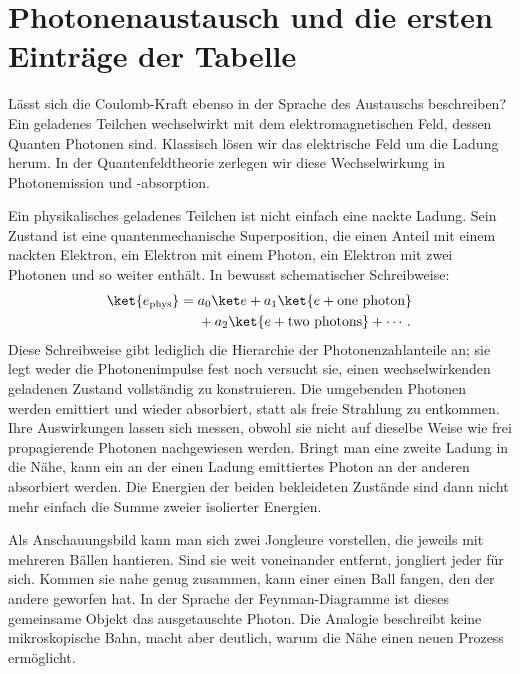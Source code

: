 \section{Photonenaustausch und die ersten Einträge der Tabelle}

Lässt sich die Coulomb-Kraft ebenso in der Sprache des Austauschs beschreiben? Ein geladenes Teilchen wechselwirkt mit dem elektromagnetischen Feld, dessen Quanten Photonen sind. Klassisch lösen wir das elektrische Feld um die Ladung herum. In der Quantenfeldtheorie zerlegen wir diese Wechselwirkung in Photonemission und -absorption.

Ein physikalisches geladenes Teilchen ist nicht einfach eine nackte Ladung. Sein Zustand ist eine quantenmechanische Superposition, die einen Anteil mit einem nackten Elektron, ein Elektron mit einem Photon, ein Elektron mit zwei Photonen und so weiter enthält. In bewusst schematischer Schreibweise:
\begin{equation}
\begin{aligned}
\ket{e_{\mathrm{phys}}}
={}&a_0\ket e
+a_1\ket{e+\text{one photon}}
\\
&+a_2\ket{e+\text{two photons}}+\cdots .
\end{aligned}
\end{equation}
Diese Schreibweise gibt lediglich die Hierarchie der Photonenzahlanteile an; sie legt weder die Photonenimpulse fest noch versucht sie, einen wechselwirkenden geladenen Zustand vollständig zu konstruieren.
Die umgebenden Photonen werden emittiert und wieder absorbiert, statt als freie Strahlung zu entkommen. Ihre Auswirkungen lassen sich messen, obwohl sie nicht auf dieselbe Weise wie frei propagierende Photonen nachgewiesen werden. Bringt man eine zweite Ladung in die Nähe, kann ein an der einen Ladung emittiertes Photon an der anderen absorbiert werden. Die Energien der beiden bekleideten Zustände sind dann nicht mehr einfach die Summe zweier isolierter Energien.

Als Anschauungsbild kann man sich zwei Jongleure vorstellen, die jeweils mit mehreren Bällen hantieren. Sind sie weit voneinander entfernt, jongliert jeder für sich. Kommen sie nahe genug zusammen, kann einer einen Ball fangen, den der andere geworfen hat. In der Sprache der Feynman-Diagramme ist dieses gemeinsame Objekt das ausgetauschte Photon. Die Analogie beschreibt keine mikroskopische Bahn, macht aber deutlich, warum die Nähe einen neuen Prozess ermöglicht.

